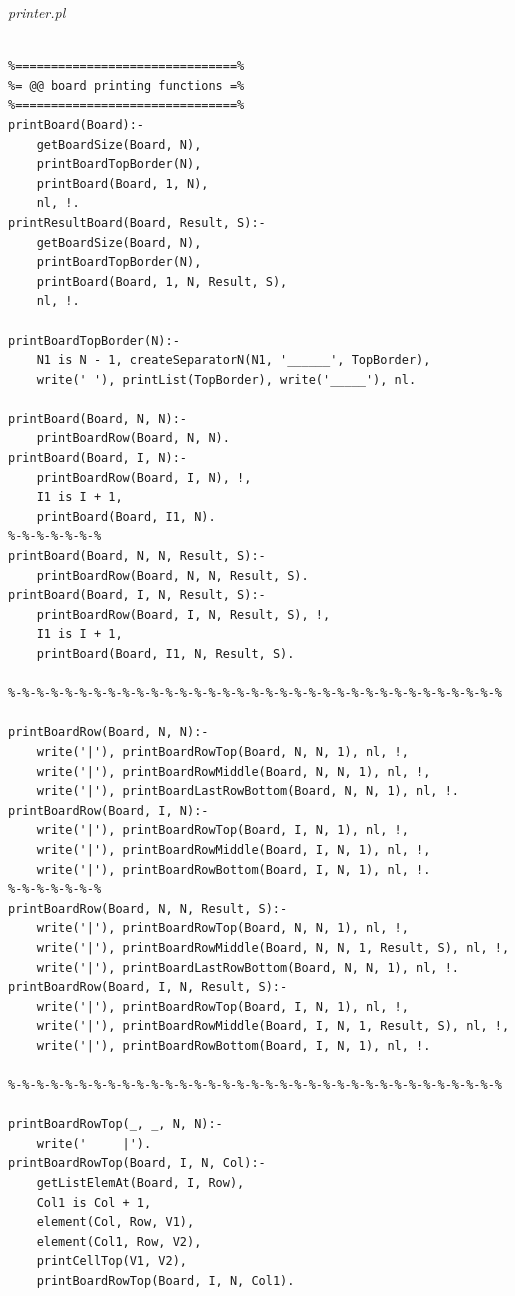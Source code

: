 \documentclass[runningheads,a4paper]{llncs}
\begin{document}
\noindent
{\it printer.pl}
\begin{changemargin}{-3cm}{-4cm}
\begin{verbatim}

%===============================%
%= @@ board printing functions =%
%===============================%
printBoard(Board):-
    getBoardSize(Board, N),
    printBoardTopBorder(N),
    printBoard(Board, 1, N),
    nl, !.
printResultBoard(Board, Result, S):-
    getBoardSize(Board, N),
    printBoardTopBorder(N),
    printBoard(Board, 1, N, Result, S),
    nl, !.

printBoardTopBorder(N):-
    N1 is N - 1, createSeparatorN(N1, '______', TopBorder),
    write(' '), printList(TopBorder), write('_____'), nl.

printBoard(Board, N, N):-
    printBoardRow(Board, N, N).
printBoard(Board, I, N):-
    printBoardRow(Board, I, N), !,
    I1 is I + 1,
    printBoard(Board, I1, N).
%-%-%-%-%-%-%
printBoard(Board, N, N, Result, S):-
    printBoardRow(Board, N, N, Result, S).
printBoard(Board, I, N, Result, S):-
    printBoardRow(Board, I, N, Result, S), !,
    I1 is I + 1,
    printBoard(Board, I1, N, Result, S).

%-%-%-%-%-%-%-%-%-%-%-%-%-%-%-%-%-%-%-%-%-%-%-%-%-%-%-%-%-%-%-%-%-%-%

printBoardRow(Board, N, N):-
    write('|'), printBoardRowTop(Board, N, N, 1), nl, !,
    write('|'), printBoardRowMiddle(Board, N, N, 1), nl, !,
    write('|'), printBoardLastRowBottom(Board, N, N, 1), nl, !.
printBoardRow(Board, I, N):-
    write('|'), printBoardRowTop(Board, I, N, 1), nl, !,
    write('|'), printBoardRowMiddle(Board, I, N, 1), nl, !,
    write('|'), printBoardRowBottom(Board, I, N, 1), nl, !.
%-%-%-%-%-%-%
printBoardRow(Board, N, N, Result, S):-
    write('|'), printBoardRowTop(Board, N, N, 1), nl, !,
    write('|'), printBoardRowMiddle(Board, N, N, 1, Result, S), nl, !,
    write('|'), printBoardLastRowBottom(Board, N, N, 1), nl, !.
printBoardRow(Board, I, N, Result, S):-
    write('|'), printBoardRowTop(Board, I, N, 1), nl, !,
    write('|'), printBoardRowMiddle(Board, I, N, 1, Result, S), nl, !,
    write('|'), printBoardRowBottom(Board, I, N, 1), nl, !.

%-%-%-%-%-%-%-%-%-%-%-%-%-%-%-%-%-%-%-%-%-%-%-%-%-%-%-%-%-%-%-%-%-%-%

printBoardRowTop(_, _, N, N):-
    write('     |').
printBoardRowTop(Board, I, N, Col):-
    getListElemAt(Board, I, Row),
    Col1 is Col + 1,
    element(Col, Row, V1),
    element(Col1, Row, V2),
    printCellTop(V1, V2),
    printBoardRowTop(Board, I, N, Col1).


\end{verbatim}
\end{changemargin}
\end{document}
